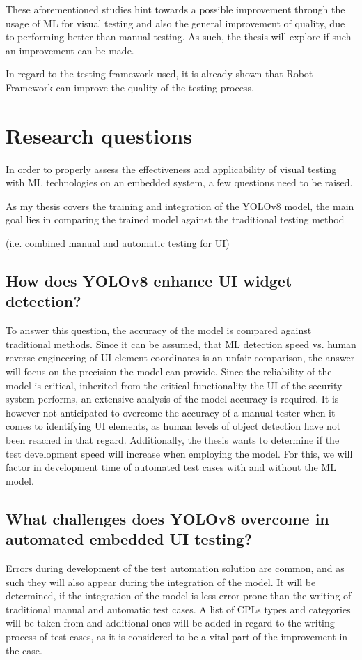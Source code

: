 \documentclass[Proposal,BIC,english,IEEE]{BASE/twbook} %
\begin{document}
These aforementioned studies hint towards a possible improvement through the usage of ML for visual testing and also the general improvement of quality, due to performing better than manual testing. As such, the thesis will explore if such an improvement can be made.

In regard to the testing framework used, it is already shown that Robot Framework can improve the quality of the testing process. \autocite{walkerSoftwareTestAutomation2020}

\newpage
\chapter{Research questions}
In order to properly assess the effectiveness and applicability of visual testing with ML technologies on an embedded system, a few questions need to be raised.

As my thesis covers the training and integration of the YOLOv8 model, the main goal lies in comparing the trained model against the traditional testing method \begin{em}(i.e. combined manual and automatic testing for UI)\end{em}
\section{How does YOLOv8 enhance UI widget detection?}
To answer this question, the accuracy of the model is compared against traditional methods. Since it can be assumed, that ML detection speed vs. human reverse engineering of UI element coordinates is an unfair comparison, the answer will focus on the precision the model can provide.
Since the reliability of the model is critical, inherited from the critical functionality the UI of the security system performs, an extensive analysis of the model accuracy is required.
It is however not anticipated to overcome the accuracy of a manual tester when it comes to identifying UI elements, as human levels of object detection have not been reached in that regard.
Additionally, the thesis wants to determine if the test development speed will increase when employing the model. For this, we will factor in development time of automated test cases with and without the ML model.

\section{What challenges does YOLOv8 overcome in automated embedded UI testing?}
Errors during development of the test automation solution are common, and as such they will also appear during the integration of the model.
It will be determined, if the integration of the model is less error-prone than the writing of traditional manual and automatic test cases.
A list of CPLs types and categories will be taken from \autocite{alegrothVisualGUITesting2015} and additional ones will be added in regard to the writing process of test cases, as it is considered to be a vital part of the improvement in the case.
\end{document}
